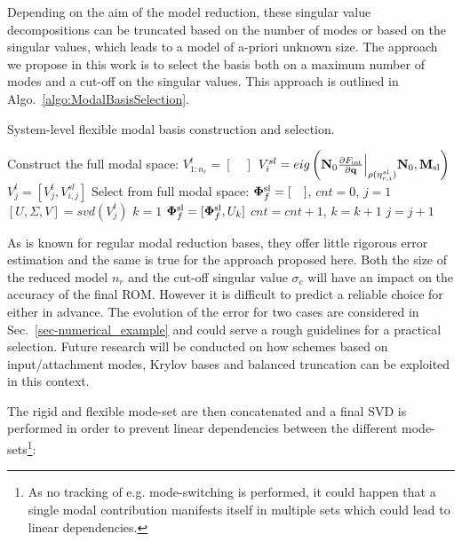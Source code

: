 \begin{itemize}
\begin{equation}
\end{equation}
Depending on the aim of the model reduction, these singular value decompositions can be truncated based on the number of modes or based on the singular values, which leads to a model of a-priori unknown size. The approach we propose in this work is to select the basis both on a maximum number of modes and a cut-off on the singular values. This approach is outlined in Algo.~\ref{algo:ModalBasisSelection}.
\begin{algorithm}
\caption{System-level flexible modal basis construction and selection.}
\label{algo:ModalBasisSelection}
\begin{algorithmic}[1]
\STATE Construct the full modal space:
\STATE $V^t_{1:n_r} = [\quad]$
\STATE $V^{sl}_{i} = eig\left(\mathbf N_0 \frac{\partial F_{\mathrm{int}}}{\partial \mathbf q}\Bigr|_{\rho(\eta^{sl}_{r,i})}\mathbf N_0, \mathbf M_{\rm sl}\right)$
\STATE $V^t_{j} = \left[V^t_{j}, V^{sl}_{i,j}\right]$
\ENDFOR
\ENDFOR
\STATE Select from full modal space:
\STATE $\bm \Phi^{\rm sl}_f = [\quad]$, $cnt = 0$, $j=1$
\STATE $[U,\Sigma,V] = svd(V^t_j)$
\STATE $k = 1$
\STATE $\bm \Phi^{\rm sl}_f = [\bm \Phi^{\rm sl}_f, U_k]$
\STATE $cnt = cnt+1$, $k = k+1$
\ENDWHILE
\STATE $j=j+1$
\ENDWHILE
\end{algorithmic}
\end{algorithm}
As is known for regular modal reduction bases, they offer little rigorous error estimation and the same is true for the approach proposed here. Both the size of the reduced model $n_r$ and the cut-off singular value $\sigma_c$ will have an impact on the accuracy of the final ROM. However it is difficult to predict a reliable choice for either in advance. The evolution of the error for two cases are considered in Sec.~\ref{sec-numerical_example} and could serve a rough guidelines for a practical selection. 
Future research will be conducted on how schemes based on input/attachment modes, Krylov bases and balanced truncation \cite{Witteveen} can be exploited in this context. 
\end{itemize}
The rigid and flexible mode-set are then concatenated and a final SVD is performed in order to prevent linear dependencies between the different mode-sets\footnote{As no tracking of e.g. mode-switching is performed, it could happen that a single modal contribution manifests itself in multiple sets which could lead to linear dependencies.}:
